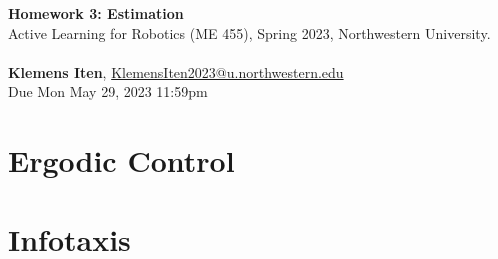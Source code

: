 \documentclass[letterpaper, 12pt]{article}
\begin{document}

\large\textbf{Homework 3: Estimation} \\  
\normalsize Active Learning for Robotics (ME 455), Spring 2023, Northwestern University.
\\ \\
\normalsize\textbf{Klemens Iten}, \href{mailto:KlemensIten2023@u.northwestern.edu}{KlemensIten2023@u.northwestern.edu}\\
\normalsize   Due Mon May 29, 2023 11:59pm

\section{Ergodic Control}

\clearpage
\section{Infotaxis}


% 
% 
\end{document}
